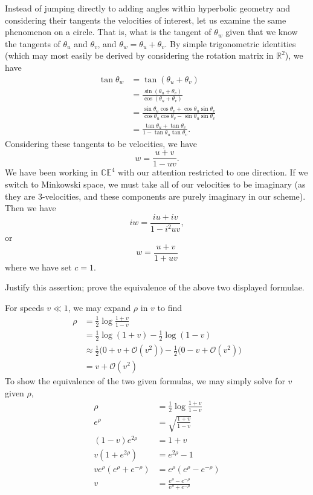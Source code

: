 \documentclass[../road-to-reality.tex]{subfiles}
\begin{document}
\begin{questions}
\begin{solution}
    Instead of jumping directly to adding angles within hyperbolic geometry and considering their tangents the velocities of interest, let us examine the same phenomenon on a circle. That is, what is the tangent of $\theta_w$ given that we know the tangents of $\theta_u$ and $\theta_v$, and $\theta_w = \theta_u + \theta_v$. By simple trigonometric identities (which may most easily be derived by considering the rotation matrix in $\mathbb{R}^2$), we have
    \begin{align*}
      \tan\theta_w &= \tan(\theta_u + \theta_v) \\
                   &= \frac{\sin(\theta_u + \theta_v)}{\cos(\theta_u + \theta_v)} \\
                   &= \frac{\sin\theta_u\cos\theta_v + \cos\theta_u\sin\theta_v}{\cos\theta_u\cos\theta_v - \sin\theta_u\sin\theta_v} \\
                   &= \frac{\tan\theta_u + \tan\theta_v}{1 - \tan\theta_u\tan\theta_v}.
    \end{align*}
    Considering these tangents to be velocities, we have
    \[
      w = \frac{u + v}{1 - uv}.
    \]
    We have been working in $\mathbb{CE}^4$ with our attention restricted to one direction. If we switch to Minkowski space, we must take all of our velocities to be imaginary (as they are $3$-velocities, and these components are purely imaginary in our scheme). Then we have
    \[
      iw = \frac{iu + iv}{1 - i^2uv},
    \]
    or
    \[
      w = \frac{u + v}{1 + uv}
    \]
    where we have set $c = 1$.
  \end{solution}

\question Justify this assertion; prove the equivalence of the above two displayed formulae.

  \begin{solution}
    For speeds $v\ll{1}$, we may expand $\rho$ in $v$ to find
    \begin{align*}
      \rho &= \frac{1}{2}\log\frac{1+v}{1-v} \\
           &= \frac{1}{2}\log(1+v) - \frac{1}{2}\log(1-v) \\
           &\approx \frac{1}{2}\Big(0 + v + \mathcal{O}(v^2)\Big) - \frac{1}{2}\Big(0 - v + \mathcal{O}(v^2)\Big) \\
           &= v + \mathcal{O}(v^2)
    \end{align*}
    To show the equivalence of the two given formulas, we may simply solve for $v$ given $\rho$,
    \begin{align*}
      \rho &= \frac{1}{2}\log\frac{1+v}{1-v} \\
      e^\rho &= \sqrt{\frac{1+v}{1-v}} \\
      (1-v)e^{2\rho} &= 1+v \\
      v(1 + e^{2\rho}) &= e^{2\rho} - 1 \\
      ve^{\rho}(e^{\rho} + e^{-\rho}) &= e^{\rho}(e^{\rho} - e^{-\rho}) \\
      v &= \frac{e^{\rho}-e^{-\rho}}{e^{\rho}+e^{-\rho}}
    \end{align*}
  \end{solution}


\end{questions}
\end{document}
